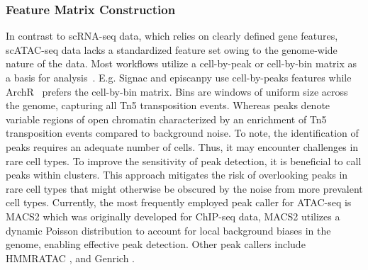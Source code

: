 \subsubsection{Feature Matrix Construction} In contrast to scRNA-seq data, which relies on clearly defined gene features, scATAC-seq data lacks a standardized feature set owing to the genome-wide nature of the data. Most workflows utilize a cell-by-peak or cell-by-bin matrix as a basis for analysis~\citep{heumos2023best}. E.g. Signac\citep{signac} and episcanpy\citep{Danese2021episcanpy} use cell-by-peaks features while ArchR~\citep{Granja2021} prefers the cell-by-bin matrix. Bins are windows of uniform size across the genome, capturing all Tn5 transposition events. Whereas peaks denote variable regions of open chromatin characterized by an enrichment of Tn5 transposition events compared to background noise. To note, the identification of peaks requires an adequate number of cells. Thus, it may encounter challenges in rare cell types. To improve the sensitivity of peak detection, it is beneficial to call peaks within clusters. This approach mitigates the risk of overlooking peaks in rare cell types that might otherwise be obscured by the noise from more prevalent cell types. Currently, the most frequently employed peak caller for ATAC-seq is MACS2 \citep{zhang2008macs2} which was originally developed for ChIP-seq data, MACS2 utilizes a dynamic Poisson distribution to account for local background biases in the genome, enabling effective peak detection. Other peak callers include HMMRATAC \citep{fu2016hmmratac}, and Genrich \citep{stark2011genrich}. 


